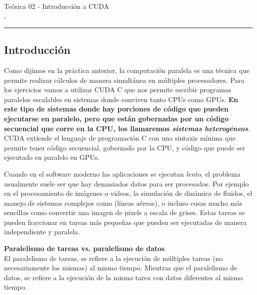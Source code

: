 



\begin{center}
  \LARGE\textbf{\coursename} \\
  \Large{Teórica 02 - Introducción a CUDA} \\
  \normalsize{\currentsemester, \currentyear} \\
  \vspace{1em}
  \hrule
\end{center}

\setcounter{section}{2}

\subsection{Introducción}

Como dijimos en la práctica anterior, la computación paralela es una técnica que permite realizar cálculos de manera
simultánea en múltiples procesadores. Para los ejercicios vamos a utilizar CUDA C que nos permite escribir programas
paralelos escalables en sistemas donde conviven tanto CPUs como GPUs. \textbf{En este tipo de sistemas donde hay
porciones de código que pueden ejecutarse en paralelo, pero que están gobernadas por un código secuencial que corre en
la CPU, los llamaremos \textit{sistemas heterogéneos}}. CUDA extiende el lenguaje de programación C con una sintaxis
mínima que permite tener código secuencial, gobernado por la CPU, y código que puede ser ejecutado en paralelo en GPUs.

Cuando en el software moderno las aplicaciones se ejecutan \textit{lento}, el problema usualmente suele ser que hay
demasiados datos para ser procesados. Por ejemplo en el procesamiento de imágenes o videos, la simulación de dinámica de
fluidos, el manejo de sistemas complejos como (líneas aéreas), o incluso cosas mucho más sencillas como convertir una
imagen de pixels a escala de grises. Estas tareas se pueden fraccionar en tareas más pequeñas que pueden ser ejecutadas
de manera independiente y paralela.

\begin{tcolorbox}[colback=mint,colframe=mint!75!black,arc=0pt,outer arc=0pt]
  \textbf{Paralelismo de tareas vs. paralelismo de datos} \\

  El paralelismo de tareas, se refiere a la ejecución de múltiples tareas (no necesariamente las mismas) al mismo tiempo.
  Mientras que el paralelismo de datos, se refiere a la ejecución de la misma tarea con datos diferentes al mismo tiempo.
\end{tcolorbox}

